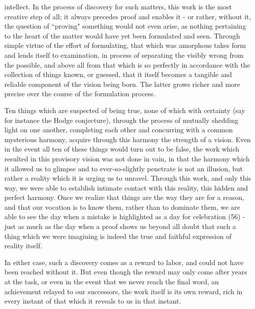 intellect. In the process of discovery for such matters, this work is the most creative step of all; it always precedes proof and enables it - or rather, without it, the question of ``proving" something would not even arise, as nothing pertaining to the heart of the matter would have yet been formulated and seen. Through simple virtue of the effort of formulating, that which was amorphous takes form and lends itself to examination, in process of separating the visibly wrong from the possible, and above all from that which is so perfectly in accordance with the collection of things known, or guessed, that it itself becomes a tangible and reliable component of the vision being born. The latter grows richer and more precise over the course of the formulation process.  

Ten things which are suspected of being true, none of which with certainty (say for instance the Hodge conjecture), through the process of mutually shedding light on one another, completing each other and concurring with a common mysterious harmony, acquire through this harmony the strength of a vision. Even in the event all ten of these things would turn out to be false, the work which resulted in this provisory vision was not done in vain, in that the harmony which it allowed us to glimpse and to ever-so-slightly penetrate is not an illusion, but rather a reality which it is urging us to unravel. Through this work, and only this way, we were able to establish intimate contact with this reality, this hidden and perfect harmony. Once we realize that things are the way they are for a reason, and that our vocation is to know them, rather than to dominate them, we are able to see the day when a mistake is highlighted as a day for celebration (56) - just as much as the day when a proof shows us beyond all doubt that such a thing which we were imagining is indeed the true and faithful expression of reality itself.

In either case, such a discovery comes as a reward to labor, and could not have been reached without it. But even though the reward may only come after years at the task, or even in the event that we never reach the final word, an achievement relayed to our successors, the work itself is its own reward, rich in every instant of that which it reveals to us in that instant.

